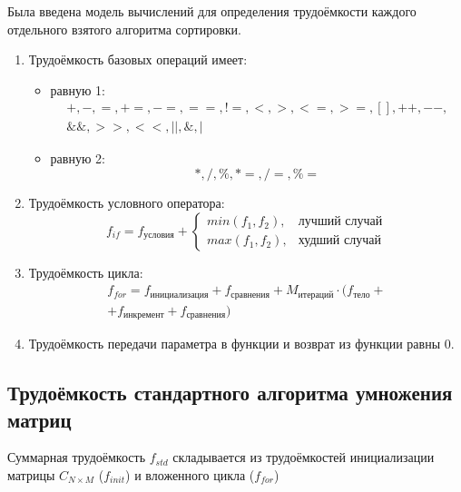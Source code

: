 Была введена модель вычислений для определения трудоёмкости каждого отдельного взятого алгоритма сортировки.

\begin{enumerate}[label={\arabic*)}]
	\item Трудоёмкость базовых операций имеет:
	\begin{itemize}[label=---]
		\item равную 1:
		\begin{equation}
			\label{for:operations_1}
			\begin{gathered}
				+, -, =, +=, -=, ==, !=, <, >, <=, >=, [], ++, {-}-,\\
				\&\&, >>, <<, ||, \&, |
			\end{gathered}
		\end{equation}
		\item равную 2:
		\begin{equation}
			\label{for:operations_2}
			*, /, \%, *=, /=, \%=
		\end{equation}
	\end{itemize}
	\item Трудоёмкость условного оператора:
	\begin{equation}
		\label{for:if}
		f_{if} = f_{\text{условия}} + 
		\begin{cases}
			min(f_1, f_2), & \text{лучший случай}\\
			max(f_1, f_2), & \text{худший случай}
		\end{cases}
	\end{equation}
	\item Трудоёмкость цикла:
	\begin{equation}
		\label{for:for}
		\begin{gathered}
			f_{for} = f_{\text{инициализация}} + f_{\text{сравнения}} + M_{\text{итераций}} \cdot (f_{\text{тело}} +\\
			+ f_{\text{инкремент}} + f_{\text{сравнения}})
		\end{gathered}
	\end{equation}
	\item Трудоёмкость передачи параметра в функции и возврат из функции равны 0.
\end{enumerate}
\clearpage

\subsection{Трудоёмкость стандартного алгоритма умножения матриц}

Суммарная трудоёмкость $f_{std}$ складывается из трудоёмкостей инициализации матрицы $C_{N \times M}$ ($f_{init}$) и  вложенного цикла ($f_{for}$)

